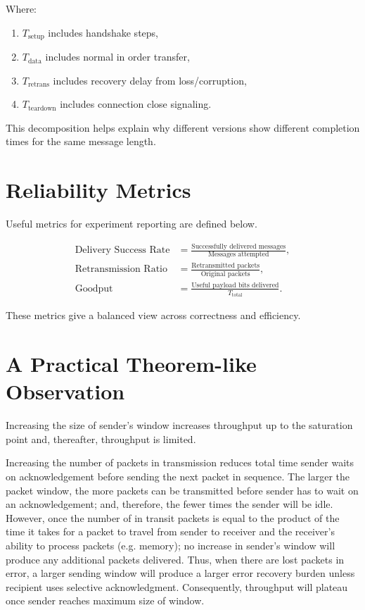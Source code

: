 Where:
\begin{enumerate}
    \item $T_{\text{setup}}$ includes handshake steps,
    \item $T_{\text{data}}$ includes normal in order transfer,
    \item $T_{\text{retrans}}$ includes recovery delay from loss/corruption,
    \item $T_{\text{teardown}}$ includes connection close signaling.
\end{enumerate}

This decomposition helps explain why different versions show different
completion times for the same message length.

\section{Reliability Metrics}
Useful metrics for experiment reporting are defined below.

\begin{align}
\text{Delivery Success Rate} &= \frac{\text{Successfully delivered messages}}{\text{Messages attempted}}, \\
\text{Retransmission Ratio} &= \frac{\text{Retransmitted packets}}{\text{Original packets}}, \\
\text{Goodput} &= \frac{\text{Useful payload bits delivered}}{T_{\text{total}}}.
\end{align}

These metrics give a balanced view across correctness and efficiency.

\section{A Practical Theorem-like Observation}
\begin{theorem}
Increasing the size of sender's window increases throughput up to the
saturation point and, thereafter, throughput is limited.
\end{theorem}

\begin{Proof}
Increasing the number of packets in transmission reduces total time sender
waits on acknowledgement before sending the next packet in sequence. The
larger the packet window, the more packets can be transmitted before sender has
to wait on an acknowledgement; and, therefore, the fewer times the sender will
be idle. However, once the number of in transit packets is equal to the
product of the time it takes for a packet to travel from sender to receiver
and the receiver's ability to process packets (e.g. memory); no increase in
sender's window will produce any additional packets delivered. Thus, when
there are lost packets in error, a larger sending window will produce a larger
error recovery burden unless recipient uses selective acknowledgment.
Consequently, throughput will plateau once sender reaches maximum size of
window.
\end{Proof}

